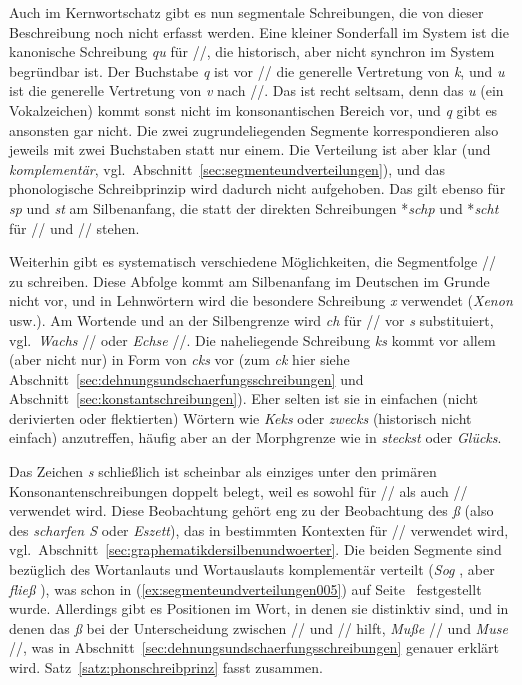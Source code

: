 Auch im Kernwortschatz gibt es nun segmentale Schreibungen, die von dieser Beschreibung noch nicht erfasst werden.
Eine kleiner Sonderfall im System ist die kanonische Schreibung \textit{qu} für //, die historisch, aber nicht synchron im System begründbar ist.
Der Buchstabe \textit{q} ist vor // die generelle Vertretung von \textit{k}, und \textit{u} ist die generelle Vertretung von \textit{v} nach //.
Das ist recht seltsam, denn das \textit{u} (ein Vokalzeichen) kommt sonst nicht im konsonantischen Bereich vor, und \textit{q} gibt es ansonsten gar nicht.
Die zwei zugrundeliegenden Segmente korrespondieren also jeweils mit zwei Buchstaben statt nur einem.
Die Verteilung ist aber klar (und \textit{komplementär}, vgl.\ Abschnitt~\ref{sec:segmenteundverteilungen}), und das phonologische Schreibprinzip wird dadurch nicht aufgehoben.
Das gilt ebenso für \textit{sp} und \textit{st} am Silbenanfang, die statt der direkten Schreibungen *\textit{schp} und *\textit{scht} für // und // stehen.

Weiterhin gibt es systematisch verschiedene Möglichkeiten, die Segmentfolge // zu schreiben.
Diese Abfolge kommt am Silbenanfang im Deutschen im Grunde nicht vor, und in Lehnwörtern wird die besondere Schreibung \textit{x} verwendet (\textit{Xenon} usw.).
Am Wortende und an der Silbengrenze wird \textit{ch} für // vor \textit{s} substituiert, vgl.\ \textit{Wachs} // oder \textit{Echse} //.
Die naheliegende Schreibung \textit{ks} kommt vor allem (aber nicht nur) in Form von \textit{cks} vor (zum \textit{ck} hier siehe Abschnitt~\ref{sec:dehnungsundschaerfungsschreibungen} und Abschnitt~\ref{sec:konstantschreibungen}).
Eher selten ist sie in einfachen (nicht derivierten oder flektierten) Wörtern wie \textit{Keks} oder \textit{zwecks} (historisch nicht einfach) anzutreffen, häufig aber an der Morphgrenze wie in \textit{steckst} oder \textit{Glücks}.

Das Zeichen \textit{s} schließlich ist scheinbar als einziges unter den primären Konsonantenschreibungen doppelt belegt, weil es sowohl für // als auch // verwendet wird.
Diese Beobachtung gehört eng zu der Beobachtung des \textit{ß} (also des \textit{scharfen S} oder \textit{Eszett}), das in bestimmten Kontexten für // verwendet wird, vgl.\ Abschnitt~\ref{sec:graphematikdersilbenundwoerter}.
Die beiden Segmente sind bezüglich des Wortanlauts und Wortauslauts komplementär verteilt (\textit{Sog} \textipa{[zo:k]}, aber \textit{fließ} \textipa{[fli:s]}), was schon in (\ref{ex:segmenteundverteilungen005}) auf Seite~\pageref{ex:segmenteundverteilungen005} festgestellt wurde.
Allerdings gibt es Positionen im Wort, in denen sie distinktiv sind, und in denen das \textit{ß} bei der Unterscheidung zwischen // und // hilft, \zB \textit{Muße} // und \textit{Muse} //, was in Abschnitt~\ref{sec:dehnungsundschaerfungsschreibungen} genauer erklärt wird.
Satz~\ref{satz:phonschreibprinz} fasst zusammen.

